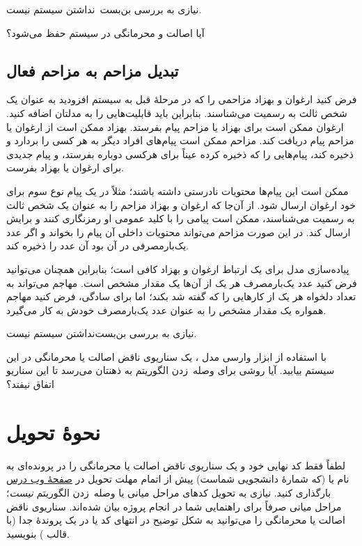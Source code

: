 \documentclass[a4paper]{article}
\begin{document}
نیازی به بررسی بن‌بست~نداشتن سیستم نیست.

آیا اصالت و محرمانگی در سیستم حفظ می‌شود؟

\subsection{تبدیل مزاحم به مزاحم فعال}

فرض کنید ارغوان و بهزاد مزاحمی را که در مرحلهٔ قبل به سیستم افزودید به عنوان یک شخص ثالث به رسمیت می‌شناسند.
بنابراین باید قابلیت‌هایی را به مدلتان اضافه کنید.
ارغوان ممکن است برای بهزاد یا مزاحم پیام بفرستد.
بهزاد ممکن است از ارغوان یا مزاحم پیام دریافت کند.
مزاحم ممکن است
پیام‌های افراد دیگر به هر کسی را بردارد و ذخیره کند،
پیام‌هایی را که ذخیره کرده عیناً برای هرکسی دوباره بفرستد،
و
پیام جدیدی برای ارغوان یا بهزاد بفرست.

ممکن است این پیام‌ها محتویات نادرستی داشته باشند؛ مثلاً  در یک پیام نوع سوم برای خود ارغوان ارسال شود.
از آن‌جا که ارغوان و بهزاد مزاحم را به عنوان یک شخص ثالث به رسمیت می‌شناسند،
ممکن است پیامی را با کلید عمومی او رمزنگاری کنند و برایش ارسال کند.
در این صورت مزاحم می‌تواند محتویات داخلی آن پیام را بخواند و اگر عدد یک‌بارمصرفی در آن بود آن عدد را ذخیره کند.

پیاده‌سازی مدل برای یک ارتباط ارغوان و بهزاد کافی است؛
بنابراین همچنان می‌توانید فرض کنید عدد یک‌بارمصرف هر یک از آن‌ها یک مقدار مشخص است.
مهاجم می‌تواند به تعداد دلخواه هر یک از کارهایی را که گفته شد بکند؛
اما برای سادگی، فرض کنید مهاجم همواره یک مقدار مشخص را به عنوان عدد یک‌بارمصرف خودش به کار می‌گیرد.

نیازی به بررسی بن‌بست‌نداشتن سیستم نیست.

با استفاده از ابزار وارسی مدل ، یک سناریوی ناقض اصالت یا محرمانگی در این سیستم بیابید.
آیا روشی برای وصله~زدن الگوریتم به ذهنتان می‌رسد تا این سناریو اتفاق نیفتد؟

\section*{نحوهٔ تحویل}

لطفاً فقط کد نهایی خود و یک سناریوی ناقض اصالت یا محرمانگی را در پرونده‌ای به نام  یا  (که  شمارهٔ دانشجویی شماست) پیش از اتمام مهلت تحویل در \href{https://cecm.ut.ac.ir/course/view.php?id=2809}{صفحهٔ وب درس} بارگذاری کنید.
نیازی به تحویل کدهای مراحل میانی یا وصله~زدن الگوریتم \textit{نیست}؛ مراحل میانی صرفاً برای راهنمایی شما در انجام پروژه بیان شده‌اند.
سناریوی ناقض اصالت یا محرمانگی را می‌توانید به شکل توضیح در انتهای کد یا در یک پروندهٔ جدا (با قالب ) بنویسید.
\end{document}
